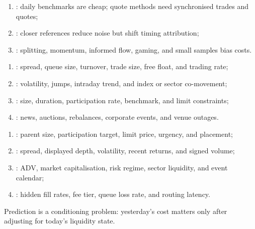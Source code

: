 \documentclass[a4paper,oneside,openany]{book}
\begin{document}
\begin{taxonomy} 
\begin{enumerate}[label=\roman*.]
\setlength{\itemsep}{0pt}
\item {}: daily benchmarks are cheap; quote methods need synchronised trades and quotes;
\item {}: closer references reduce noise but shift timing attribution;
\item {}: splitting, momentum, informed flow, gaming, and small samples bias costs.
\end{enumerate}
\end{taxonomy}

\begin{taxonomy} 
\begin{enumerate}[label=\roman*.]
\setlength{\itemsep}{0pt}
\item {}: spread, queue size, turnover, trade size, free float, and trading rate;
\item {}: volatility, jumps, intraday trend, and index or sector co-movement;
\item {}: size, duration, participation rate, benchmark, and limit constraints;
\item {}: news, auctions, rebalances, corporate events, and venue outages.
\end{enumerate}
\end{taxonomy}

\begin{taxonomy} 
\begin{enumerate}[label=\roman*.]
\setlength{\itemsep}{0pt}
\item {}: parent size, participation target, limit price, urgency, and placement;
\item {}: spread, displayed depth, volatility, recent returns, and signed volume;
\item {}: ADV, market capitalisation, risk regime, sector liquidity, and event calendar;
\item {}: hidden fill rates, fee tier, queue loss rate, and routing latency.
\end{enumerate}
Prediction is a conditioning problem: yesterday's cost matters only after adjusting for today's liquidity state.
\end{taxonomy}
\end{document}
